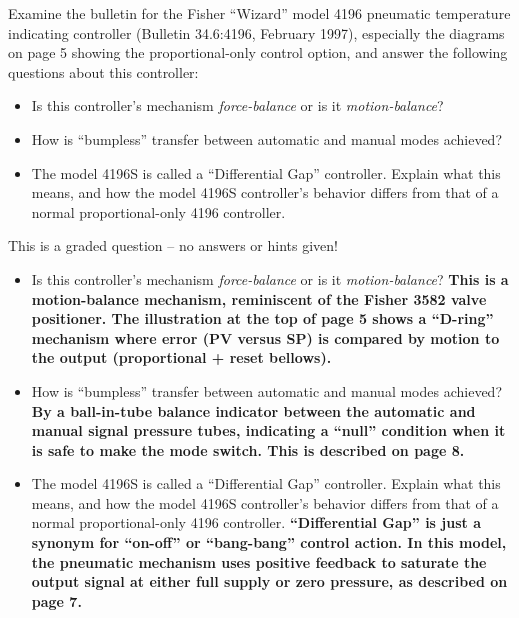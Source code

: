 

Examine the bulletin for the Fisher ``Wizard'' model 4196 pneumatic temperature indicating controller (Bulletin 34.6:4196, February 1997), especially the diagrams on page 5 showing the proportional-only control option, and answer the following questions about this controller:

\vskip 50pt

\begin{itemize}
\item{} Is this controller's mechanism {\it force-balance} or is it {\it motion-balance}?
\vskip 70pt
\item{} How is ``bumpless'' transfer between automatic and manual modes achieved?
\vskip 70pt
\item{} The model 4196S is called a ``Differential Gap'' controller.  Explain what this means, and how the model 4196S controller's behavior differs from that of a normal proportional-only 4196 controller.
\end{itemize}

\vfil

\eject






This is a graded question -- no answers or hints given!







\begin{itemize}
\item{} Is this controller's mechanism {\it force-balance} or is it {\it motion-balance}?  {\bf This is a motion-balance mechanism, reminiscent of the Fisher 3582 valve positioner.  The illustration at the top of page 5 shows a ``D-ring'' mechanism where error (PV versus SP) is compared by motion to the output (proportional + reset bellows).}
\vskip 10pt
\item{} How is ``bumpless'' transfer between automatic and manual modes achieved?  {\bf By a ball-in-tube balance indicator between the automatic and manual signal pressure tubes, indicating a ``null'' condition when it is safe to make the mode switch.  This is described on page 8.}
\vskip 10pt
\item{} The model 4196S is called a ``Differential Gap'' controller.  Explain what this means, and how the model 4196S controller's behavior differs from that of a normal proportional-only 4196 controller.  {\bf ``Differential Gap'' is just a synonym for ``on-off'' or ``bang-bang'' control action.  In this model, the pneumatic mechanism uses positive feedback to saturate the output signal at either full supply or zero pressure, as described on page 7.}
\end{itemize}




